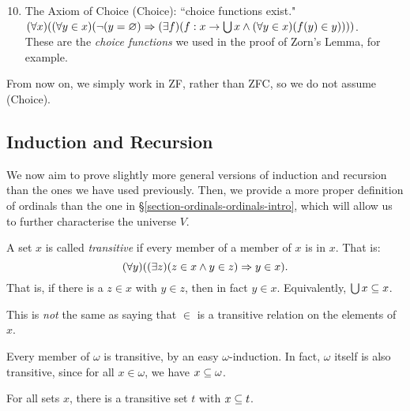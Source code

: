 \documentclass{article}
\begin{document}
\begin{enumerate}
	\setcounter{enumi}{9}
    \item The Axiom of Choice (Choice): ``choice functions exist." \\
    $(\forall x)((\forall y \in x)(\lnot(y = \varnothing) \Rightarrow (\exists f)(f : x \to \bigcup x \land (\forall y \in x)(f(y) \in y))))$. \\
    These are the \textit{choice functions} we used in the proof of Zorn's Lemma, for example.
\end{enumerate}

\begin{note}
	From now on, we simply work in ZF, rather than ZFC, so we do not assume (Choice).
\end{note}


\subsection{Induction and Recursion}

We now aim to prove slightly more general versions of induction and recursion than the ones we have used previously. Then, we provide a more proper definition of ordinals than the one in \S\ref{section-ordinals-ordinals-intro}, which will allow us to further characterise the universe $V$.

\begin{definition}
    A set $x$ is called \textit{transitive} if every member of a member of $x$ is in $x$. That is:
    \[
	(\forall y)((\exists z)(z \in x \land y \in z) \Rightarrow y \in x).
	\]
	That is, if there is a $z \in x$ with $y \in z$, then in fact $y \in x$. Equivalently, $\bigcup x \subseteq x$.
\end{definition}

\begin{note}
	This is \textit{not} the same as saying that $\in$ is a transitive relation on the elements of $x$.
\end{note}

Every member of $\omega$ is transitive, by an easy $\omega$-induction. In fact, $\omega$ itself is also transitive, since for all $x \in \omega$, we have $x \subseteq \omega$.

\begin{proposition}
	For all sets $x$, there is a transitive set $t$ with $x \subseteq t$.
\end{proposition}
\end{document}

